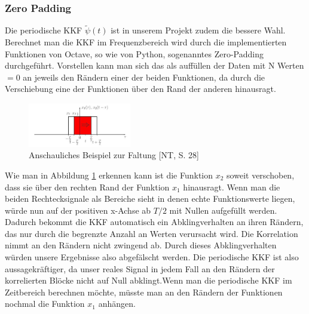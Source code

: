 \subsubsection{Zero Padding}
Die periodische KKF $\tilde{\psi}(t)$ ist in unserem Projekt zudem die bessere Wahl. Berechnet man die KKF im Frequenzbereich wird durch die implementierten Funktionen von Octave, so wie von Python, sogenanntes Zero-Padding durchgeführt. Vorstellen kann man sich das als auffüllen der Daten mit N Werten $=0$ an jeweils den Rändern einer der beiden Funktionen, da durch die Verschiebung eine der Funktionen über den Rand der anderen hinausragt.
\begin{figure}[ht!] 
  \centering
     \includegraphics[width=0.4\textwidth]{img/Faltung}
  \caption{Anschauliches Beispiel zur Faltung [NT, S. 28]}
  \label{fig:Bild1}
\end{figure}
Wie man in Abbildung \ref{fig:Bild1} erkennen kann ist die Funktion $x_2$ soweit verschoben, dass sie über den rechten Rand der Funktion $x_1$ hinausragt. Wenn man die beiden Rechtecksignale als Bereiche sieht in denen echte Funktionswerte liegen, würde nun auf der positiven x-Achse ab $T/2$ mit Nullen aufgefüllt werden. Dadurch bekommt die KKF automatisch ein Abklingverhalten an ihren Rändern, das nur durch die begrenzte Anzahl an Werten verursacht wird. Die Korrelation nimmt an den Rändern nicht zwingend ab. Durch dieses Abklingverhalten würden unsere Ergebnisse also abgefälscht werden. Die periodische KKF ist also aussagekräftiger, da unser reales Signal in jedem Fall an den Rändern der korrelierten Blöcke nicht auf Null abklingt.Wenn man die periodische KKF im Zeitbereich berechnen möchte, müsste man an den Rändern der Funktionen nochmal die Funktion $x_1$ anhängen.
